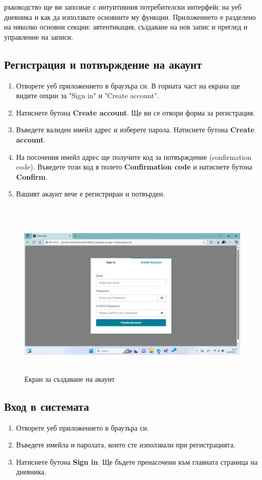 \documentclass[12pt]{article}
\begin{document}
 ръководство ще ви запознае с интуитивния потребителски интерфейс на уеб дневника и как да използвате основните му функции. Приложението е разделено на няколко основни секции: автентикация, създаване на нов запис и преглед и управление на записи.

\medskip

\subsection{Регистрация и потвърждение на акаунт}
\begin{enumerate}
    \item Отворете уеб приложението в браузъра си. В горната част на екрана ще видите опции за "Sign in" и "Create account".
    \item Натиснете бутона \textbf{Create account}. Ще ви се отвори форма за регистрация.
    \item Въведете валиден имейл адрес и изберете парола. Натиснете бутона \textbf{Create account}.
    \item На посочения имейл адрес ще получите код за потвърждение (confirmation code). Въведете този код в полето \textbf{Confirmation code} и натиснете бутона \textbf{Confirm}.
    \item Вашият акаунт вече е регистриран и потвърден.
\end{enumerate}

 \begin{figure}[H]
\centering
    \includegraphics[scale=0.4]{create_account.png}
  \caption{Екран за създаване на акаунт}
\end{figure}

\subsection{Вход в системата}
\begin{enumerate}
    \item Отворете уеб приложението в браузъра си. 
    \item Въведете имейла и паролата, които сте използвали при регистрацията.
    \item Натиснете бутона \textbf{Sign in}. Ще бъдете пренасочени към главната страница на дневника.
\end{enumerate}
\end{document}
